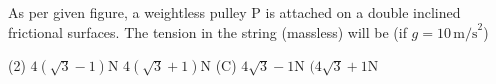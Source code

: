 \item As per given figure, a weightless pulley P is attached on a double inclined frictional surfaces. The tension in the string (massless) will be (if \(g = 10 \, \text{m/s}^2\))
    \begin{center}
    \end{center}
    \begin{tasks}(2)
        \task \( 4\left(\sqrt{3} - 1\right) \text{N} \)
        \task \( 4\left(\sqrt{3} + 1\right) \text{N} \)
        \task (C) \(4\sqrt{3} - 1\text{N} \)
        \task \( (4\sqrt{3} + 1\text{N} \)
    \end{tasks}
